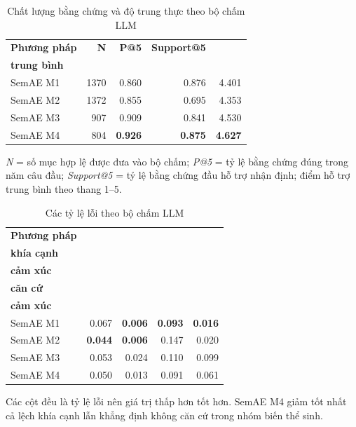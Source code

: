 \begin{table}[tbp]
\centering
\caption{Chất lượng bằng chứng và độ trung thực theo bộ chấm LLM}
\label{tab:evidence-faithfulness}
\begin{threeparttable}
\begin{tabular}{l r r r r}
\toprule
\textbf{Phương pháp} & \textbf{N} & \textbf{P@5} & \textbf{Support@5} & \makecell{\textbf{Điểm hỗ trợ}\\\textbf{trung bình}} \\
\midrule
SemAE M1 & 1370 & \num{0.860} & \num{0.876} & \num{4.401} \\
SemAE M2 & 1372 & \num{0.855} & \num{0.695} & \num{4.353} \\
SemAE M3 &  907 & \num{0.909} & \num{0.841} & \num{4.530} \\
SemAE M4 &  804 & \textbf{\num{0.926}} & \textbf{\num{0.875}} & \textbf{\num{4.627}} \\
\bottomrule
\end{tabular}
\begin{tablenotes}
\footnotesize
\item \textit{N} = số mục hợp lệ được đưa vào bộ chấm; \textit{P@5} = tỷ lệ bằng chứng đúng trong năm câu đầu; \textit{Support@5} = tỷ lệ bằng chứng đầu hỗ trợ nhận định; điểm hỗ trợ trung bình theo thang 1--5.
\end{tablenotes}
\end{threeparttable}
\end{table}

\begin{table}[tbp]
\centering
\caption{Các tỷ lệ lỗi theo bộ chấm LLM}
\label{tab:judge-errors}
\begin{threeparttable}
\begin{tabular}{l r r r r}
\toprule
\textbf{Phương pháp} & \makecell{\textbf{Lệch}\\\textbf{khía cạnh}} & \makecell{\textbf{Lệch}\\\textbf{cảm xúc}} & \makecell{\textbf{Không}\\\textbf{căn cứ}} & \makecell{\textbf{Lật}\\\textbf{cảm xúc}} \\
\midrule
SemAE M1 & \num{0.067} & \textbf{\num{0.006}} & \textbf{\num{0.093}} & \textbf{\num{0.016}} \\
SemAE M2 & \textbf{\num{0.044}} & \textbf{\num{0.006}} & \num{0.147} & \num{0.020} \\
SemAE M3 & \num{0.053} & \num{0.024} & \num{0.110} & \num{0.099} \\
SemAE M4 & \num{0.050} & \num{0.013} & \num{0.091} & \num{0.061} \\
\bottomrule
\end{tabular}
\begin{tablenotes}
\footnotesize
\item Các cột đều là tỷ lệ lỗi nên giá trị thấp hơn tốt hơn. SemAE M4 giảm tốt nhất cả lệch khía cạnh lẫn khẳng định không căn cứ trong nhóm biến thể sinh.
\end{tablenotes}
\end{threeparttable}
\end{table}

